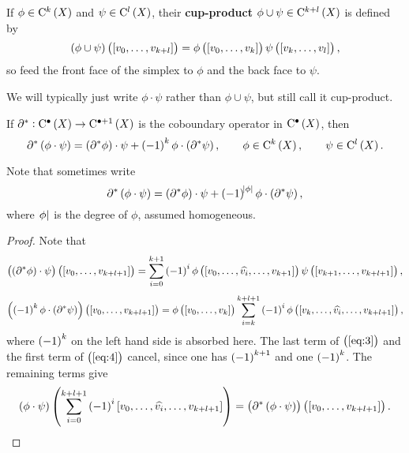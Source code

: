 \begin{definition*}
If $ \phi \in \C^k\br{X} $ and $ \psi \in \C^l\br{X} $, their \textbf{cup-product} $ \phi \cup \psi \in \C^{k + l}\br{X} $ is defined by
$$ \br{\phi \cup \psi}\br{\sbr{v_0, \dots, v_{k + l}}} = \phi\br{\sbr{v_0, \dots, v_k}}\psi\br{\sbr{v_k, \dots, v_l}}, $$
so feed the front face of the simplex to $ \phi $ and the back face to $ \psi $.
\end{definition*}

\begin{notation*}
We will typically just write $ \phi \cdot \psi $ rather than $ \phi \cup \psi $, but still call it cup-product.
\end{notation*}

\begin{lemma}
If $ \da^* : \C^\bullet\br{X} \to \C^{\bullet + 1}\br{X} $ is the coboundary operator in $ \C^\bullet\br{X} $, then
$$ \da^*\br{\phi \cdot \psi} = \br{\da^*\phi} \cdot \psi + \br{-1}^k\phi \cdot \br{\da^*\psi}, \qquad \phi \in \C^k\br{X}, \qquad \psi \in \C^l\br{X}. $$
\end{lemma}

Note that sometimes write
$$ \da^*\br{\phi \cdot \psi} = \br{\da^*\phi} \cdot \psi + \br{-1}^{\abs{\phi}}\phi \cdot \br{\da^*\psi}, $$
where $ \abs{\phi} $ is the degree of $ \phi $, assumed homogeneous.

\begin{proof}
Note that
\begin{equation}
\label{eq:3}
\br{\br{\da^*\phi} \cdot \psi}\br{\sbr{v_0, \dots, v_{k + l + 1}}} = \sum_{i = 0}^{k + 1} \br{-1}^i\phi\br{\sbr{v_0, \dots, \widehat{v_i}, \dots, v_{k + 1}}}\psi\br{\sbr{v_{k + 1}, \dots, v_{k + l + 1}}},
\end{equation}
\begin{equation}
\label{eq:4}
\br{\br{-1}^k\phi \cdot \br{\da^*\psi}}\br{\sbr{v_0, \dots, v_{k + l + 1}}} = \phi\br{\sbr{v_0, \dots, v_k}}\sum_{i = k}^{k + l + 1} \br{-1}^i\phi\br{\sbr{v_k, \dots, \widehat{v_i}, \dots, v_{k + l + 1}}},
\end{equation}
where $ \br{-1}^k $ on the left hand side is absorbed here. The last term of $ \br{\ref{eq:3}} $ and the first term of $ \br{\ref{eq:4}} $ cancel, since one has $ \br{-1}^{k + 1} $ and one $ \br{-1}^k $. The remaining terms give
$$ \br{\phi \cdot \psi}\br{\sum_{i = 0}^{k + l + 1} \br{-1}^i\sbr{v_0, \dots, \widehat{v_i}, \dots, v_{k + l + 1}}} = \br{\da^*\br{\phi \cdot \psi}}\br{\sbr{v_0, \dots, v_{k + l + 1}}}. $$
\end{proof}

